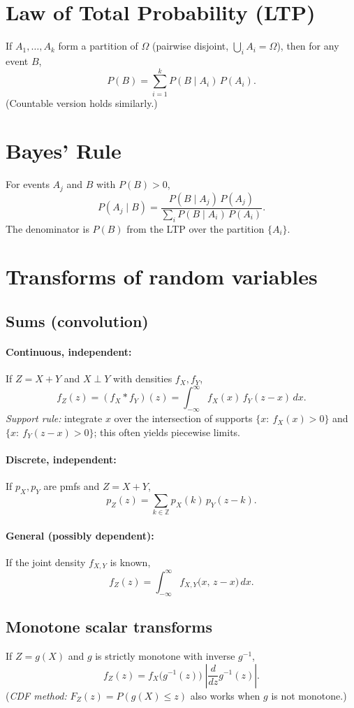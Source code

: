 \documentclass[12pt]{article}
\begin{document}
\section*{Law of Total Probability (LTP)}
If \(A_1,\dots,A_k\) form a partition of \(\Omega\) (pairwise disjoint, \(\bigcup_i A_i=\Omega\)), then for any event \(B\),
\[
P(B)=\sum_{i=1}^k P(B\mid A_i)\,P(A_i).
\]
(Countable version holds similarly.)

\section*{Bayes' Rule}
For events \(A_j\) and \(B\) with \(P(B)>0\),
\[
P(A_j\mid B)=\frac{P(B\mid A_j)\,P(A_j)}{\sum_{i} P(B\mid A_i)\,P(A_i)}.
\]
The denominator is \(P(B)\) from the LTP over the partition \(\{A_i\}\).

\section{Transforms of random variables}

\subsection{Sums (convolution)}
\paragraph{Continuous, independent:}
If $Z=X+Y$ and $X\perp Y$ with densities $f_X,f_Y$,
\[
f_Z(z)=(f_X * f_Y)(z)=\int_{-\infty}^{\infty} f_X(x)\,f_Y(z-x)\,dx.
\]
\textit{Support rule:} integrate $x$ over the intersection of supports
$\{x:\ f_X(x)>0\}$ and $\{x:\ f_Y(z-x)>0\}$; this often yields piecewise limits.

\paragraph{Discrete, independent:}
If $p_X,p_Y$ are pmfs and $Z=X+Y$,
\[
p_Z(z)=\sum_{k\in\mathbb Z} p_X(k)\,p_Y(z-k).
\]

\paragraph{General (possibly dependent):}
If the joint density $f_{X,Y}$ is known,
\[
f_Z(z)=\int_{-\infty}^{\infty} f_{X,Y}\big(x,\,z-x\big)\,dx.
\]

\subsection{Monotone scalar transforms}
If $Z=g(X)$ and $g$ is strictly monotone with inverse $g^{-1}$,
\[
f_Z(z)= f_X\!\big(g^{-1}(z)\big)\;\left|\frac{d}{dz}g^{-1}(z)\right|.
\]
(\textit{CDF method:} $F_Z(z)=P(g(X)\le z)$ also works when $g$ is not monotone.)
\end{document}
